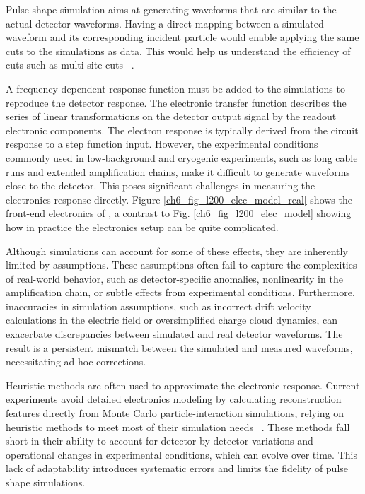 Pulse shape simulation aims at generating waveforms that are similar to the actual detector waveforms. Having a direct mapping between a simulated waveform and its corresponding incident particle would enable applying the same cuts to the simulations as data. This would help us understand the efficiency of cuts such as multi-site cuts ~\cite{AvsE}.  

A frequency-dependent response function must be added to the simulations to reproduce the detector response. The electronic transfer function describes the series of linear transformations on the detector output signal by the readout electronic components. The electron response is typically derived from the circuit response to a step function input. However, the experimental conditions commonly used in low-background and cryogenic experiments, such as long cable runs and extended amplification chains, make it difficult to generate waveforms close to the detector. This poses significant challenges in measuring the electronics response directly. Figure \ref{ch6_fig_l200_elec_model_real} shows the front-end electronics of {\Ltwo}, a contrast to Fig. \ref{ch6_fig_l200_elec_model} showing how in practice the electronics setup can be quite complicated.

Although simulations can account for some of these effects, they are inherently limited by assumptions. These assumptions often fail to capture the complexities of real-world behavior, such as detector-specific anomalies, nonlinearity in the amplification chain, or subtle effects from experimental conditions. Furthermore, inaccuracies in simulation assumptions, such as incorrect drift velocity calculations in the electric field or oversimplified charge cloud dynamics, can exacerbate discrepancies between simulated and real detector waveforms. The result is a persistent mismatch between the simulated and measured waveforms, necessitating ad hoc corrections. 

Heuristic methods are often used to approximate the electronic response. Current experiments avoid detailed electronics modeling by calculating reconstruction features directly from Monte Carlo particle-interaction simulations, relying on heuristic methods to meet most of their simulation needs ~\cite{Ben_Thesis,Sam_Thesis}. These methods fall short in their ability to account for detector-by-detector variations and operational changes in experimental conditions, which can evolve over time. This lack of adaptability introduces systematic errors and limits the fidelity of pulse shape simulations.


